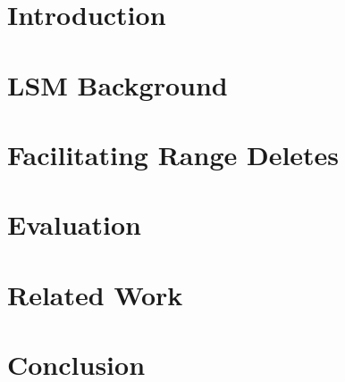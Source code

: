 \documentclass[10pt,sigconf]{acmart}
\begin{document}
\section{Introduction}
\label{sec:intro}


\section{LSM Background}
\label{sec:background}
 


% 
 
\section{Facilitating Range Deletes}
\label{sec:solution}


% 

\section{Evaluation}
\label{sec:experimental_results}


\section{Related Work}
\label{sec:related_work}

 
\section{Conclusion}
\label{sec:conclusion}



\balance 
{
 
} 
\end{document}
